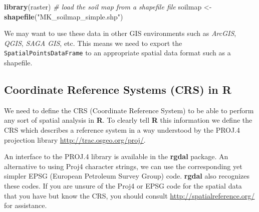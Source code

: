 \documentclass[10pt,b5paper,]{book}
\newenvironment{Shaded}{\begin{snugshade}}{\end{snugshade}}
\newcommand{\CommentTok}[1]{\textcolor[rgb]{0.56,0.35,0.01}{\textit{#1}}}
\newcommand{\DataTypeTok}[1]{\textcolor[rgb]{0.13,0.29,0.53}{#1}}
\newcommand{\KeywordTok}[1]{\textcolor[rgb]{0.13,0.29,0.53}{\textbf{#1}}}
\newcommand{\NormalTok}[1]{#1}
\newcommand{\OperatorTok}[1]{\textcolor[rgb]{0.81,0.36,0.00}{\textbf{#1}}}
\newcommand{\OtherTok}[1]{\textcolor[rgb]{0.56,0.35,0.01}{#1}}
\newcommand{\StringTok}[1]{\textcolor[rgb]{0.31,0.60,0.02}{#1}}
\theoremstyle{definition}
\theoremstyle{definition}
\theoremstyle{definition}
\theoremstyle{remark}
\begin{document}
\begin{Shaded}
\begin{Highlighting}[]
\KeywordTok{library}\NormalTok{(raster)}
\CommentTok{# load the soil map from a shapefile file}
\NormalTok{soilmap <-}\StringTok{ }\KeywordTok{shapefile}\NormalTok{(}\StringTok{"MK_soilmap_simple.shp"}\NormalTok{)}
\end{Highlighting}
\end{Shaded}

We may want to use these data in other GIS environments such as
\emph{ArcGIS}, \emph{QGIS}, \emph{SAGA GIS}, etc. This means we need to
export the \texttt{SpatialPointsDataFrame} to an appropriate spatial
data format such as a shapefile.

\begin{Shaded}
\end{Shaded}

\hypertarget{coordinate-reference-systems-crs-in-r}{%
\subsection{Coordinate Reference Systems (CRS) in
R}\label{coordinate-reference-systems-crs-in-r}}

We need to define the CRS (Coordinate Reference System) to be able to
perform any sort of spatial analysis in \textbf{R}. To clearly tell
\textbf{R} this information we define the CRS which describes a
reference system in a way understood by the PROJ.4 projection library
\url{http://trac.osgeo.org/proj/}.

An interface to the PROJ.4 library is available in the \textbf{rgdal}
package. An alternative to using Proj4 character strings, we can use the
corresponding yet simpler EPSG (European Petroleum Survey Group) code.
\textbf{rgdal} also recognizes these codes. If you are unsure of the
Proj4 or EPSG code for the spatial data that you have but know the CRS,
you should consult \url{http://spatialreference.org/} for assistance.
\end{document}
